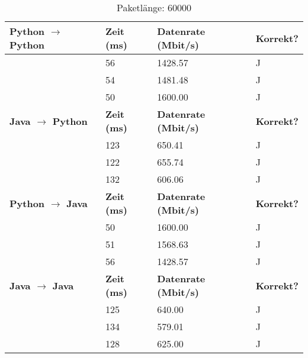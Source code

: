 \documentclass{article}
\begin{document}
    \begin{table}[]
        \caption{Paketlänge: 60000}
        \label{tab:my-table}
        \begin{tabular}{|l|l|l|l|}
            \hline
            \textbf{Python $\rightarrow$ Python} & \textbf{Zeit (ms)} & \textbf{Datenrate (Mbit/s)} & \textbf{Korrekt?} \\ \hline
            & 56       & 1428.57         & J        \\ \cline{2-4}
            & 54       & 1481.48         & J        \\ \cline{2-4}
            & 50       & 1600.00         & J        \\ \hline
            \textbf{Java $\rightarrow$ Python}   & \textbf{Zeit (ms)} & \textbf{Datenrate (Mbit/s)} & \textbf{Korrekt?} \\ \hline
            & 123      & 650.41          & J        \\ \cline{2-4}
            & 122      & 655.74          & J        \\ \cline{2-4}
            & 132      & 606.06          & J        \\ \hline
            \textbf{Python $\rightarrow$ Java}  & \textbf{Zeit (ms)} & \textbf{Datenrate (Mbit/s)} & \textbf{Korrekt?} \\ \hline
            & 50       & 1600.00         & J        \\ \cline{2-4}
            & 51       & 1568.63         & J        \\ \cline{2-4}
            & 56       & 1428.57         & J        \\ \hline
            \textbf{Java $\rightarrow$ Java}   & \textbf{Zeit (ms)} & \textbf{Datenrate (Mbit/s)} & \textbf{Korrekt?} \\ \hline
            & 125      & 640.00          & J        \\ \cline{2-4}
            & 134      & 579.01          & J        \\ \cline{2-4}
            & 128      & 625.00          & J        \\ \hline
        \end{tabular}
    \end{table}
\end{document}
